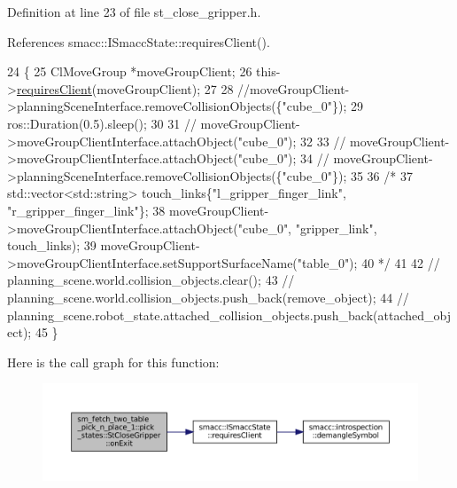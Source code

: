 Definition at line 23 of file st\+\_\+close\+\_\+gripper.\+h.



References smacc\+::\+I\+Smacc\+State\+::requires\+Client().


\begin{DoxyCode}
24    \{
25       ClMoveGroup *moveGroupClient;
26       this->\hyperlink{classsmacc_1_1ISmaccState_a7f95c9f0a6ea2d6f18d1aec0519de4ac}{requiresClient}(moveGroupClient);
27 
28       \textcolor{comment}{//moveGroupClient->planningSceneInterface.removeCollisionObjects(\{"cube\_0"\});}
29       ros::Duration(0.5).sleep();
30 
31       \textcolor{comment}{// moveGroupClient->moveGroupClientInterface.attachObject("cube\_0");}
32 
33       \textcolor{comment}{// moveGroupClient->moveGroupClientInterface.attachObject("cube\_0");}
34       \textcolor{comment}{// moveGroupClient->planningSceneInterface.removeCollisionObjects(\{"cube\_0"\});}
35 
36       \textcolor{comment}{/*}
37 \textcolor{comment}{         std::vector<std::string> touch\_links\{"l\_gripper\_finger\_link", "r\_gripper\_finger\_link"\};}
38 \textcolor{comment}{         moveGroupClient->moveGroupClientInterface.attachObject("cube\_0", "gripper\_link", touch\_links);}
39 \textcolor{comment}{         moveGroupClient->moveGroupClientInterface.setSupportSurfaceName("table\_0");}
40 \textcolor{comment}{         */}
41 
42       \textcolor{comment}{// planning\_scene.world.collision\_objects.clear();}
43       \textcolor{comment}{// planning\_scene.world.collision\_objects.push\_back(remove\_object);}
44       \textcolor{comment}{// planning\_scene.robot\_state.attached\_collision\_objects.push\_back(attached\_object);}
45    \}
\end{DoxyCode}
Here is the call graph for this function\+:
\nopagebreak
\begin{figure}[H]
\begin{center}
\leavevmode
\includegraphics[width=350pt]{structsm__fetch__two__table__pick__n__place__1_1_1pick__states_1_1StCloseGripper_adce3130d68e84e5432884872170e789f_cgraph}
\end{center}
\end{figure}
\mbox{\label{structsm__fetch__two__table__pick__n__place__1_1_1pick__states_1_1StCloseGripper_abeb0ec2de7ddc46d2aa39c9050ad57b6}} 
